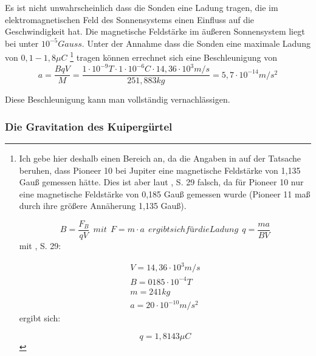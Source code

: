 Es ist nicht unwahrscheinlich dass die Sonden eine Ladung tragen, die im
elektromagnetischen Feld des Sonnensystems einen Einfluss auf die
Geschwindigkeit hat. Die magnetische Feldst\"arke im \"au{\ss}eren
Sonnensystem liegt bei unter  $10^{-5}\mathit{Gauss}$\cite{Anderson2002}.
Unter der Annahme dass die Sonden eine maximale Ladung von  $0,1-1,8\mu
C$
\footnote{	%
Ich gebe hier deshalb einen Bereich an, da die Angaben in \cite{Null1976} auf der Tatsache beruhen, dass
Pioneer 10 bei Jupiter eine magnetische Feldst\"arke von 1,135 Gau{\ss}
gemessen h\"atte. Dies ist aber laut \cite{Anderson2002}, S. 29 falsch, da f\"ur Pioneer 10 nur eine
magnetische Feldst\"arke von 0,185 Gau{\ss} gemessen wurde (Pioneer 11
ma{\ss} durch ihre gr\"o{\ss}ere Ann\"aherung 1,135 Gau{\ss}).

\begin{equation*}
B=\frac{F_{B}}{\mathit{qV}}\ \ \mathit{mit}\ \ F=m\cdot
a\ \ \mathit{ergibt}\mathit{sich}\mathit{f\text{\"u}r}\mathit{die}\mathit{Ladung}\ \ q=\frac{\mathit{ma}}{\mathit{BV}}
\end{equation*}
mit \cite{Anderson2002}, S. 29:

\begin{equation*}
\begin{gathered}V=14,36\cdot 10^{3}m/s\\B=0185\cdot
10^{-4}T\\m=241\mathit{kg}\\a=20\cdot 10^{-10}m/s^{2}\end{gathered}
\end{equation*}
ergibt sich:

\begin{equation*}
q=1,8143\mu C
\end{equation*}
}
tragen k\"onnen errechnet sich eine Beschleunigung von 
\begin{equation}
a=\frac{\mathit{BqV}}{M}=\frac{1\cdot 10^{-9}T\cdot 1\cdot
10^{-6}C\cdot 14,36\cdot 10^{3}m/s}{251,883\mathit{kg}}=5,7\cdot
10^{-14}m/s^{2}
\end{equation}

Diese Beschleunigung kann man vollst\"andig vernachl\"assigen. 


\bigskip

\subsubsection{ Die Gravitation des Kuiperg\"urtel}

